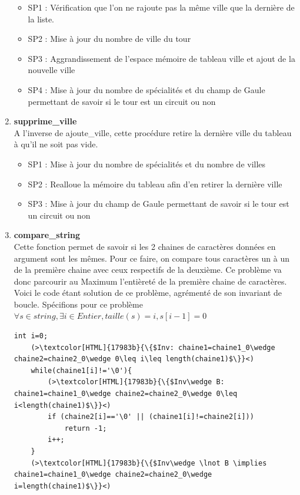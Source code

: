 \documentclass[a4paper, 11pt, oneside]{article}
\begin{document}
\begin{enumerate}
    \begin{itemize}
        \item SP1 : Vérification que l'on ne rajoute pas la même ville que la dernière de la liste.
        \item SP2 : Mise à jour du nombre de ville du tour
        \item SP3 : Aggrandissement de l'espace mémoire de tableau ville et ajout de la nouvelle ville
        \item SP4 : Mise à jour du nombre de spécialités et du champ de Gaule permettant de savoir 
        si le tour est un circuit ou non
    \end{itemize}
    \item \textbf{supprime\_ville}
    \\A l'inverse de ajoute\_ville, cette procédure retire la dernière ville du tableau à
    qu'il ne soit pas vide.
    \begin{itemize}
        \item SP1 : Mise à jour du nombre de spécialités et du nombre de villes
        \item SP2 : Realloue la mémoire du tableau afin d'en retirer la dernière ville
        \item SP3 : Mise à jour du champ de Gaule permettant de savoir si le tour est un circuit ou non
    \end{itemize}
    \item \textbf{compare\_string}
    \\Cette fonction permet de savoir si les 2 chaines de caractères données en argument 
    sont les mêmes. Pour ce faire, on compare tous caractères un à un de la première chaine 
    avec ceux respectifs de la deuxième.
    Ce problème va donc parcourir au Maximum l'entièreté de la première chaine de caractères.
    \\Voici le code étant solution de ce problème, agrémenté de son invariant de boucle.
    Spécifions pour ce problème $\forall s\in string, \exists i\in Entier, taille(s)=i, s[i-1]=0$
    \begin{lstlisting}[caption = {code comparaison de 2 chaines de caractères}]
    int i=0;
    (>\textcolor[HTML]{17983b}{\{$Inv: chaine1=chaine1_0\wedge chaine2=chaine2_0\wedge 0\leq i\leq length(chaine1)$\}}<)
    while(chaine1[i]!='\0'){
        (>\textcolor[HTML]{17983b}{\{$Inv\wedge B: chaine1=chaine1_0\wedge chaine2=chaine2_0\wedge 0\leq i<length(chaine1)$\}}<)
        if (chaine2[i]=='\0' || (chaine1[i]!=chaine2[i]))
            return -1;
        i++;
    }
    (>\textcolor[HTML]{17983b}{\{$Inv\wedge \lnot B \implies chaine1=chaine1_0\wedge chaine2=chaine2_0\wedge i=length(chaine1)$\}}<)

\end{lstlisting}
\end{enumerate}
\end{document}
